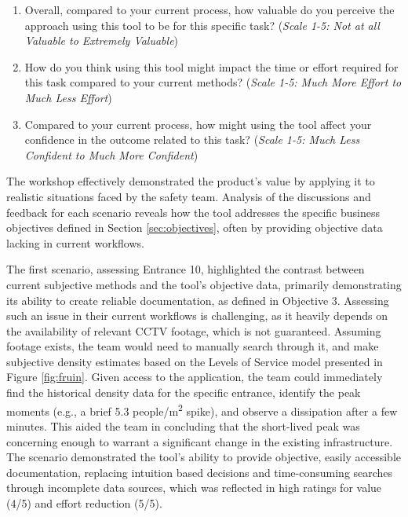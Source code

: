 \begin{enumerate}
  \item Overall, compared to your current process, how valuable do you perceive the approach using this tool to be for this specific task? (\textit{Scale 1-5: Not at all Valuable to Extremely Valuable})
  \item How do you think using this tool might impact the time or effort required for this task compared to your current methods? (\textit{Scale 1-5: Much More Effort to Much Less Effort})
  \item Compared to your current process, how might using the tool affect your confidence in the outcome related to this task? (\textit{Scale 1-5: Much Less Confident to Much More Confident})
\end{enumerate}

The workshop effectively demonstrated the product's value by applying it to realistic situations faced by the safety team. Analysis of the discussions and feedback for each scenario reveals how the tool addresses the specific business objectives defined in Section \ref{sec:objectives}, often by providing objective data lacking in current workflows.

The first scenario, assessing Entrance 10, highlighted the contrast between current subjective methods and the tool's objective data, primarily demonstrating its ability to create reliable documentation, as defined in Objective 3. Assessing such an issue in their current workflows is challenging, as it heavily depends on the availability of relevant CCTV footage, which is not guaranteed. Assuming footage exists, the team would need to manually search through it, and make subjective density estimates based on the Levels of Service model presented in Figure \ref{fig:fruin}. Given access to the application, the team could immediately find the historical density data for the specific entrance, identify the peak moments (e.g., a brief 5.3 people/m\textsuperscript{2} spike), and observe a dissipation after a few minutes. This aided the team in concluding that the short-lived peak was concerning enough to warrant a significant change in the existing infrastructure. The scenario demonstrated the tool's ability to provide objective, easily accessible documentation, replacing intuition based decisions and time-consuming searches through incomplete data sources, which was reflected in high ratings for value (4/5) and effort reduction (5/5).

